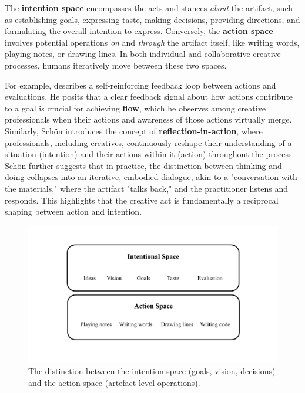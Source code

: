 The \textbf{intention space} encompasses the acts and stances \textit{about} the artifact, such as establishing goals, expressing taste, making decisions, providing directions, and formulating the overall intention to express. Conversely, the \textbf{action space} involves potential operations \textit{on} and \textit{through} the artifact itself, like writing words, playing notes, or drawing lines. In both individual and collaborative creative processes, humans iteratively move between these two spaces.

For example, \cite{Csikszentmihalyi1997-ui} describes a self-reinforcing feedback loop between actions and evaluations. He posits that a clear feedback signal about how actions contribute to a goal is crucial for achieving \textbf{flow}, which he observes among creative professionals when their actions and awareness of those actions virtually merge. Similarly, Schön \cite{Schon1987-fy} introduces the concept of \textbf{reflection-in-action}, where professionals, including creatives, continuously reshape their understanding of a situation (intention) and their actions within it (action) throughout the process. Schön \cite{Schon1992-jt} further suggests that in practice, the distinction between thinking and doing collapses into an iterative, embodied dialogue, akin to a "conversation with the materials," where the artifact "talks back," and the practitioner listens and responds. This highlights that the creative act is fundamentally a reciprocal shaping between action and intention.

\begin{figure}[H]
 \centering
\includegraphics[width=1\linewidth]{intention action spaces.png}
 \caption{The distinction between the intention space (goals, vision, decisions) and the action space (artefact-level operations).}
 \label{fig:intention-action-spaces}
\end{figure}

